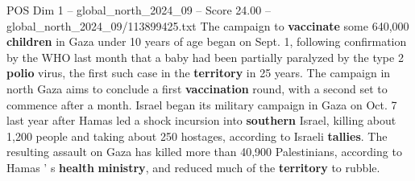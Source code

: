 \begin{textsample}{POS Dim 1 – global\_north\_2024\_09 – Score 24.00 – global\_north\_2024\_09/113899425.txt}
The campaign to \textbf{vaccinate} some 640,000 \textbf{children} in Gaza under 10 years of age began on Sept. 1, following confirmation by the WHO last month that a baby had been partially paralyzed by the type 2 \textbf{polio} virus, the first such case in the \textbf{territory} in 25 years.
The campaign in north Gaza aims to conclude a first \textbf{vaccination} round, with a second set to commence after a month.
Israel began its military campaign in Gaza on Oct. 7 last year after Hamas led a shock incursion into \textbf{southern} Israel, killing about 1,200 people and taking about 250 hostages, according to Israeli \textbf{tallies}.
The resulting assault on Gaza has killed more than 40,900 Palestinians, according to Hamas ' s \textbf{health} \textbf{ministry}, and reduced much of the \textbf{territory} to rubble.

\end{textsample}
